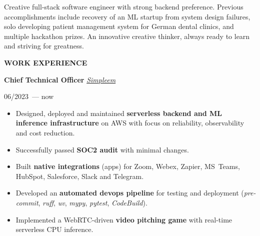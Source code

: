 \documentclass[10pt]{article}
\newcommand{\cvrsect}[1]{
    \begin{tcolorbox}[
            sharp corners,
            enhanced,
            colback=rightSectionTitle,
            colframe=rightSectionTitle,
            coltext=leftBackground,
            left=0.5cm,
            right=0.5cm,
            bottom=4pt,
            top=4pt,
            width=\linewidth+8.5px,
            enlarge left by=-8.5px,
            fontupper=\large]
        \MakeUppercase{\textbf{#1}}
    \end{tcolorbox}
    \vspace*{-0.5\baselineskip+0.75em}
}
\def\leftcolumnwidth{0.3\textwidth}
\begin{document}
\begin{minipage}[t]{\textwidth - \leftcolumnwidth - 6pt}
    \vspace{0.5cm-\baselineskip+4px}
    Creative full-stack software engineer with strong backend preference.
    Previous accomplishments include recovery of an ML startup from system design failures, solo developing patient management system for German dental clinics, and multiple hackathon prizes.
    An innovative creative thinker, always ready to learn and striving for greatness.

    \cvrsect{Work experience}
    \textbf{Chief Technical Officer}
    \hfill
    \textit{\href{https://simpleem.com/}{Simpleem}}
    \vspace{1em}

    \begin{minipage}{0.25\textwidth}
        06/2023~--- now
    \end{minipage}
    \begin{minipage}{0.75\textwidth}

        \begin{itemize}[topsep=4pt,parsep=0pt,leftmargin=*]
            \item
            \raggedright
            Designed, deployed and maintained \textbf{serverless backend and ML inference infrastructure} on AWS with focus on reliability, observability and cost reduction.

            \item
            \raggedright
            Successfully passed \textbf{SOC2 audit} with minimal changes.

            \item
            \raggedright
            Built \textbf{native integrations} (apps) for Zoom, Webex, Zapier, MS~Teams, HubSpot, Salesforce, Slack and Telegram.

            \item
            \raggedright
            Developed an \textbf{automated devops pipeline} for testing and deployment (\textit{pre-commit}, \textit{ruff}, \textit{uv}, \textit{mypy}, \textit{pytest}, \textit{CodeBuild}).

            \item
            \raggedright
            Implemented a WebRTC-driven \textbf{video pitching game} with real-time serverless CPU inference.
        \end{itemize}
    \end{minipage}

    \vspace{1em}


\end{minipage}
\end{document}
